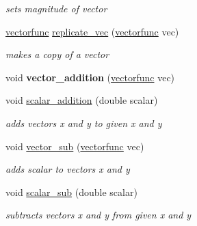 \begin{DoxyCompactItemize}
\begin{DoxyCompactList}\small\item\em sets magnitude of vector \end{DoxyCompactList}\item 
\mbox{\label{classvectorfunc_af1763065cd6216015d32c24b5a39b54d}} 
\mbox{\hyperlink{classvectorfunc}{vectorfunc}} \mbox{\hyperlink{classvectorfunc_af1763065cd6216015d32c24b5a39b54d}{replicate\+\_\+vec}} (\mbox{\hyperlink{classvectorfunc}{vectorfunc}} vec)
\begin{DoxyCompactList}\small\item\em makes a copy of a vector \end{DoxyCompactList}\item 
\mbox{\label{classvectorfunc_a60a58f9f69b9405170ba0c7aeae02218}} 
void {\bfseries vector\+\_\+addition} (\mbox{\hyperlink{classvectorfunc}{vectorfunc}} vec)
\item 
\mbox{\label{classvectorfunc_a51703c48203ca0a2ce528c48fa155194}} 
void \mbox{\hyperlink{classvectorfunc_a51703c48203ca0a2ce528c48fa155194}{scalar\+\_\+addition}} (double scalar)
\begin{DoxyCompactList}\small\item\em adds vector\textquotesingle{}s x and y to given x and y \end{DoxyCompactList}\item 
\mbox{\label{classvectorfunc_a1d296f0222889c61e1117e94674d90ec}} 
void \mbox{\hyperlink{classvectorfunc_a1d296f0222889c61e1117e94674d90ec}{vector\+\_\+sub}} (\mbox{\hyperlink{classvectorfunc}{vectorfunc}} vec)
\begin{DoxyCompactList}\small\item\em adds scalar to vector\textquotesingle{}s x and y \end{DoxyCompactList}\item 
\mbox{\label{classvectorfunc_a687fdc907ad8844d6703b881d2cc4c1b}} 
void \mbox{\hyperlink{classvectorfunc_a687fdc907ad8844d6703b881d2cc4c1b}{scalar\+\_\+sub}} (double scalar)
\begin{DoxyCompactList}\small\item\em subtracts vector\textquotesingle{}s x and y from given x and y \end{DoxyCompactList}\item 

\end{DoxyCompactItemize}
